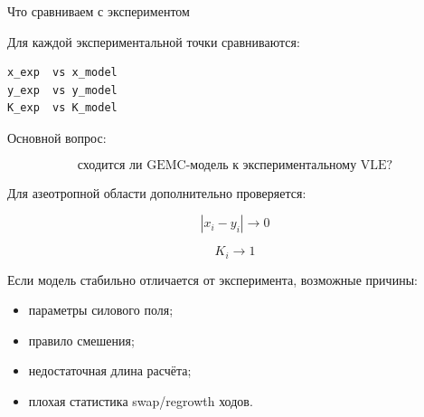 \documentclass[10pt, aspectratio=169]{beamer}
\begin{document}
\begin{frame}[fragile]{Что сравниваем с экспериментом}

Для каждой экспериментальной точки сравниваются:

\begin{lstlisting}
x_exp  vs x_model
y_exp  vs y_model
K_exp  vs K_model
\end{lstlisting}

\vspace{0.3cm}

Основной вопрос:

\[
    \text{сходится ли GEMC-модель к экспериментальному VLE?}
\]

\vspace{0.3cm}

Для азеотропной области дополнительно проверяется:

\[
    |x_i - y_i| \rightarrow 0
\]

\[
    K_i \rightarrow 1
\]

\vspace{0.3cm}

Если модель стабильно отличается от эксперимента, возможные причины:

\begin{itemize}
    \item параметры силового поля;
    \item правило смешения;
    \item недостаточная длина расчёта;
    \item плохая статистика swap/regrowth ходов.
\end{itemize}

\end{frame}
\end{document}
